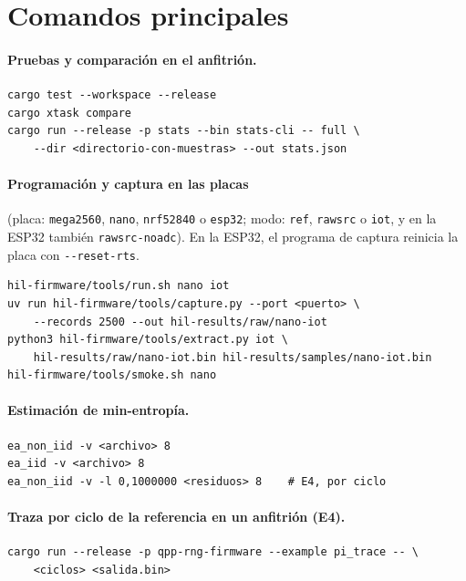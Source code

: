 \section{Comandos principales}

\paragraph{Pruebas y comparación en el anfitrión.}
\begin{lstlisting}
cargo test --workspace --release
cargo xtask compare
cargo run --release -p stats --bin stats-cli -- full \
    --dir <directorio-con-muestras> --out stats.json
\end{lstlisting}

\paragraph{Programación y captura en las placas} (placa: \texttt{mega2560}, \texttt{nano}, \texttt{nrf52840} o \texttt{esp32}; modo: \texttt{ref}, \texttt{rawsrc} o \texttt{iot}, y en la ESP32 también \texttt{rawsrc-noadc}). En la ESP32, el programa de captura reinicia la placa con \texttt{-{}-reset-rts}.
\begin{lstlisting}
hil-firmware/tools/run.sh nano iot
uv run hil-firmware/tools/capture.py --port <puerto> \
    --records 2500 --out hil-results/raw/nano-iot
python3 hil-firmware/tools/extract.py iot \
    hil-results/raw/nano-iot.bin hil-results/samples/nano-iot.bin
hil-firmware/tools/smoke.sh nano
\end{lstlisting}

\paragraph{Estimación de min-entropía.}
\begin{lstlisting}
ea_non_iid -v <archivo> 8
ea_iid -v <archivo> 8
ea_non_iid -v -l 0,1000000 <residuos> 8    # E4, por ciclo
\end{lstlisting}

\paragraph{Traza por ciclo de la referencia en un anfitrión (E4).}
\begin{lstlisting}
cargo run --release -p qpp-rng-firmware --example pi_trace -- \
    <ciclos> <salida.bin>
\end{lstlisting}

